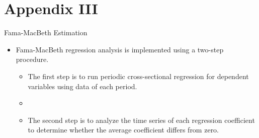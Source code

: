 \documentclass[handout]{beamer}
\begin{document}
	\section{Appendix III}
	
	\begin{frame}{Fama-MacBeth Estimation}\label{Methood}
		\begin{itemize}
			\item Fama-MacBeth regression analysis is implemented using a two-step procedure. 
			\begin{itemize}
				\item The first step is to
				run periodic cross-sectional regression for dependent variables using data of each period.
				\item[]
				\item
				The second step is to analyze the time series
				of each regression coefficient to determine whether the average coefficient differs from zero.
			\end{itemize}
			
		\end{itemize}
	\end{frame}
	
\end{document}
